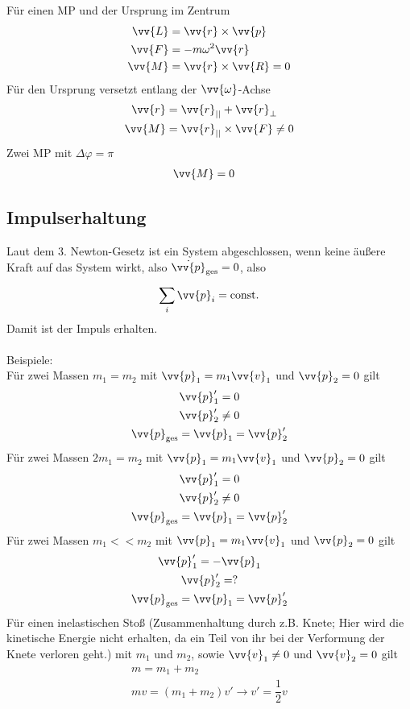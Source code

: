\documentclass[a4paper,12pt]{article}
\begin{document}
Für einen MP und der Ursprung im Zentrum
\begin{align*}
        \vv{L}&=\vv{r}\times \vv{p}\\
        \vv{F}&=-m\omega ^2\vv{r}\\
        \vv{M}&=\vv{r}\times \vv{R}=0
\end{align*}
Für den Ursprung versetzt entlang der $\vv{\omega }$-Achse
\begin{align*}
        \vv{r}&=\vv{r}_{||}+\vv{r}_{\perp}\\
        \vv{M}&=\vv{r}_{||}\times\vv{F}\neq 0
\end{align*}
Zwei MP mit $\Delta \varphi =\pi $
\begin{align*}
        \vv{M}&=0
\end{align*}

\subsection{Impulserhaltung}
Laut dem 3. Newton-Gesetz ist ein System abgeschlossen, wenn keine äußere Kraft auf das System wirkt, also $\dot{\vv{p}}_{\text{ges}}=0$, also
\[ 
        \sum_{i}^{}\vv{p}_i=\text{const}
.\] 
Damit ist der Impuls erhalten.\\\\
Beispiele:\\
Für zwei Massen $m_1=m_2$ mit $\vv{p}_1=m_1\vv{v}_1$ und $\vv{p}_2=0$ gilt
\begin{gather*}
        \vv{p}'_1=0\\
        \vv{p}'_2\neq 0\\
        \vv{p}_{\text{ges}}=\vv{p}_1=\vv{p}'_2
\end{gather*}
Für zwei Massen $2m_1=m_2$ mit $\vv{p}_1=m_1\vv{v}_1$ und $\vv{p}_2=0$ gilt
\begin{gather*}
        \vv{p}'_1=0\\
        \vv{p}'_2\neq 0\\
        \vv{p}_{\text{ges}}=\vv{p}_1=\vv{p}'_2
\end{gather*}
Für zwei Massen $m_1<<m_2$ mit $\vv{p}_1=m_1\vv{v}_1$ und $\vv{p}_2=0$ gilt
\begin{gather*}
        \vv{p}'_1=-\vv{p}_1\\
        \vv{p}'_2=?\\
        \vv{p}_{\text{ges}}=\vv{p}_1=\vv{p}'_2
\end{gather*}
Für einen inelastischen Stoß (Zusammenhaltung durch z.B. Knete; Hier wird die kinetische Energie nicht erhalten, da ein Teil von ihr bei der Verformung der Knete verloren geht.) mit $m_1$ und $m_2$, sowie $\vv{v}_1\neq 0$ und $\vv{v}_2=0$ gilt
\begin{gather*}
        m=m_1+m_2\\
        mv=\left(m_1+m_2\right)v'\rightarrow v'=\dfrac{1}{2}v
\end{gather*}
\end{document}
